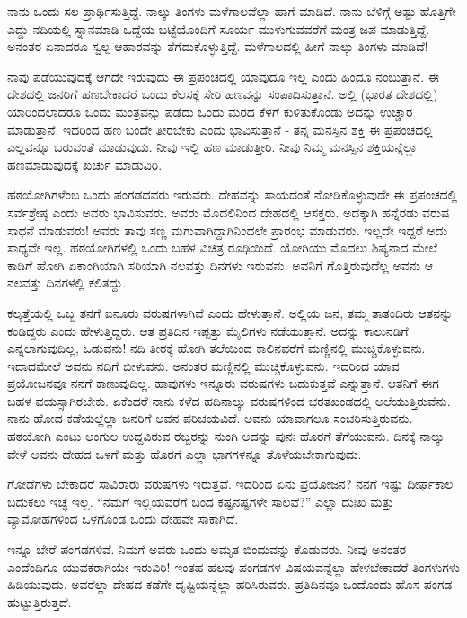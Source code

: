 ನಾನು ಒಂದು ಸಲ ಪ್ರಾರ್ಥಿಸುತ್ತಿದ್ದೆ. ನಾಲ್ಕು ತಿಂಗಳು ಮಳೆಗಾಲವೆಲ್ಲಾ ಹಾಗೆ ಮಾಡಿದೆ. ನಾನು ಬೆಳಿಗ್ಗೆ ಅಷ್ಟು ಹೊತ್ತಿಗೇ ಎದ್ದು ನದಿಯಲ್ಲಿ ಸ್ನಾನಮಾಡಿ ಒದ್ದೆಯ ಬಟ್ಟೆಯೊಂದಿಗೆ ಸೂರ್ಯ ಮುಳುಗುವವರೆಗೆ ಮಂತ್ರ ಜಪ ಮಾಡುತ್ತಿದ್ದೆ. ಅನಂತರ ಏನಾದರೂ ಸ್ವಲ್ಪ ಆಹಾರವನ್ನು ತೆಗೆದುಕೊಳ್ಳುತ್ತಿದ್ದೆ. ಮಳೆಗಾಲದಲ್ಲಿ ಹೀಗೆ ನಾಲ್ಕು ತಿಂಗಳು ಮಾಡಿದೆ!

ನಾವು ಪಡೆಯುವುದಕ್ಕೆ ಆಗದೇ ಇರುವುದು ಈ ಪ್ರಪಂಚದಲ್ಲಿ ಯಾವುದೂ ಇಲ್ಲ ಎಂದು ಹಿಂದೂ ನಂಬುತ್ತಾನೆ. ಈ ದೇಶದಲ್ಲಿ ಜನರಿಗೆ ಹಣಬೇಕಾದರೆ ಒಂದು ಕೆಲಸಕ್ಕೆ ಸೇರಿ ಹಣವನ್ನು ಸಂಪಾದಿಸುತ್ತಾನೆ. ಅಲ್ಲಿ (ಭಾರತ ದೇಶದಲ್ಲಿ) ಯಾರಿಂದಲಾದರೂ ಒಂದು ಮಂತ್ರವನ್ನು ಪಡೆದು ಒಂದು ಮರದ ಕೆಳಗೆ ಕುಳಿತುಕೊಂಡು ಅದನ್ನು ಉಚ್ಚಾರ ಮಾಡುತ್ತಾನೆ. ಇದರಿಂದ ಹಣ ಬಂದೇ ತೀರಬೇಕು ಎಂದು ಭಾವಿಸುತ್ತಾನೆ - ತನ್ನ ಮನಸ್ಸಿನ ಶಕ್ತಿ ಈ ಪ್ರಪಂಚದಲ್ಲಿ ಎಲ್ಲವನ್ನೂ ಬರುವಂತೆ ಮಾಡುವುದು. ನೀವು ಇಲ್ಲಿ ಹಣ ಮಾಡುತ್ತೀರಿ. ನೀವು ನಿಮ್ಮ ಮನಸ್ಸಿನ ಶಕ್ತಿಯನ್ನೆಲ್ಲಾ ಹಣಮಾಡುವುದಕ್ಕೆ ಖರ್ಚು ಮಾಡುವಿರಿ.

ಹಠಯೋಗಿಗಳೆಂಬ ಒಂದು ಪಂಗಡದವರು ಇರುವರು. ದೇಹವನ್ನು ಸಾಯದಂತೆ ನೋಡಿಕೊಳ್ಳುವುದೇ ಈ ಪ್ರಪಂಚದಲ್ಲಿ ಸರ್ವಶ್ರೇಷ್ಠ ಎಂದು ಅವರು ಭಾವಿಸುವರು. ಅವರು ಮೊದಲಿನಿಂದ ದೇಹದಲ್ಲಿ ಆಸಕ್ತರು. ಅದಕ್ಕಾಗಿ ಹನ್ನೆರಡು ವರುಷ ಸಾಧನೆ ಮಾಡುವರು! ಅವರು ತಾವು ಸಣ್ಣ ಮಗುವಾಗಿದ್ದಾಗಿನಿಂದಲೇ ಪ್ರಾರಂಭ ಮಾಡುವರು. ಇಲ್ಲದೇ ಇದ್ದರೆ ಅದು ಸಾಧ್ಯವೇ ಇಲ್ಲ. ಹಠಯೋಗಿಗಳಲ್ಲಿ ಒಂದು ಬಹಳ ವಿಚಿತ್ರ ರೂಢಿಯಿದೆ. ಯೋಗಿಯು ಮೊದಲು ಶಿಷ್ಯನಾದ ಮೇಲೆ ಕಾಡಿಗೆ ಹೋಗಿ ಏಕಾಂಗಿಯಾಗಿ ಸರಿಯಾಗಿ ನಲವತ್ತು ದಿನಗಳು ಇರುವನು. ಅವನಿಗೆ ಗೊತ್ತಿರುವುದೆಲ್ಲ ಅವನು ಆ ನಲವತ್ತು ದಿನಗಳಲ್ಲಿ ಕಲಿತದ್ದು.

ಕಲ್ಕತ್ತೆಯಲ್ಲಿ ಒಬ್ಬ ತನಗೆ ಐನೂರು ವರುಷಗಳಾಗಿವೆ ಎಂದು ಹೇಳುತ್ತಾನೆ. ಅಲ್ಲಿಯ ಜನ, ತಮ್ಮ ತಾತಂದಿರು ಆತನನ್ನು ಕಂಡಿದ್ದರು ಎಂದು ಹೇಳುತ್ತಿದ್ದರು. ಆತ ಪ್ರತಿದಿನ ಇಪ್ಪತ್ತು ಮೈಲಿಗಳು ನಡೆಯುತ್ತಾನೆ. ಅದನ್ನು ಕಾಲುನಡಿಗೆ ಎನ್ನಲಾಗುವುದಿಲ್ಲ, ಓಡುವನು! ನದಿ ತೀರಕ್ಕೆ ಹೋಗಿ ತಲೆಯಿಂದ ಕಾಲಿನವರೆಗೆ ಮಣ್ಣಿನಲ್ಲಿ ಮುಚ್ಚಿಕೊಳ್ಳುವನು. ಇದಾದಮೇಲೆ ಅವನು ನದಿಗೆ ಬೀಳುವನು. ಅನಂತರ ಮಣ್ಣಿನಲ್ಲಿ ಮುಚ್ಚಿಕೊಳ್ಳುವನು. ಇದರಿಂದ ಯಾವ ಪ್ರಯೋಜನವೂ ನನಗೆ ಕಾಣುವುದಿಲ್ಲ. ಹಾವುಗಳು ಇನ್ನೂರು ವರುಷಗಳು ಬದುಕುತ್ತವೆ ಎನ್ನುತ್ತಾನೆ. ಆತನಿಗೆ ಈಗ ಬಹಳ ವಯಸ್ಸಾಗಿರಬೇಕು. ಏಕೆಂದರೆ ನಾನು ಕಳೆದ ಹದಿನಾಲ್ಕು ವರುಷಗಳಿಂದ ಭರತಖಂಡದಲ್ಲಿ ಅಲೆಯುತ್ತಿರುವೆನು. ನಾನು ಹೋದ ಕಡೆಯಲ್ಲೆಲ್ಲಾ ಜನರಿಗೆ ಅವನ ಪರಿಚಯವಿದೆ. ಅವನು ಯಾವಾಗಲೂ ಸಂಚರಿಸುತ್ತಿರುವನು. ಹಠಯೋಗಿ ಎಂಟು ಅಂಗುಲ ಉದ್ದವಿರುವ ರಬ್ಬರನ್ನು ನುಂಗಿ ಅದನ್ನು ಪುನಃ ಹೊರಗೆ ತೆಗೆಯುವನು. ದಿನಕ್ಕೆ ನಾಲ್ಕು ವೇಳೆ ಅವನು ದೇಹದ ಒಳಗೆ ಮತ್ತು ಹೊರಗೆ ಎಲ್ಲಾ ಭಾಗಗಳನ್ನೂ ತೊಳೆಯಬೇಕಾಗುವುದು.

ಗೋಡೆಗಳು ಬೇಕಾದರೆ ಸಾವಿರಾರು ವರುಷಗಳು ಇರುತ್ತವೆ. ಇದರಿಂದ ಏನು ಪ್ರಯೋಜನ? ನನಗೆ ಇಷ್ಟು ದೀರ್ಘಕಾಲ ಬದುಕಲು ಇಚ್ಛೆ ಇಲ್ಲ. “ನಮಗೆ ಇಲ್ಲಿಯವರೆಗೆ ಬಂದ ಕಷ್ಟನಷ್ಟಗಳೇ ಸಾಲವೆ?” ಎಲ್ಲಾ ದುಃಖ ಮತ್ತು ವ್ಯಾಮೋಹಗಳಿಂದ ಒಳಗೊಂಡ ಒಂದು ದೇಹವೇ ಸಾಕಾಗಿದೆ.

ಇನ್ನೂ ಬೇರೆ ಪಂಗಡಗಳಿವೆ. ನಿಮಗೆ ಅವರು ಒಂದು ಅಮೃತ ಬಿಂದುವನ್ನು ಕೊಡುವರು. ನೀವು ಅನಂತರ ಎಂದೆಂದಿಗೂ ಯುವಕರಾಗಿಯೇ ಇರುವಿರಿ! ಇಂತಹ ಹಲವು ಪಂಗಡಗಳ ವಿಷಯವನ್ನೆಲ್ಲಾ ಹೇಳಬೇಕಾದರೆ ತಿಂಗಳುಗಳು ಹಿಡಿಯುವುದು. ಅವರೆಲ್ಲಾ ದೇಹದ ಕಡೆಗೇ ದೃಷ್ಟಿಯನ್ನೆಲ್ಲಾ ಹರಿಸಿರುವರು. ಪ್ರತಿದಿನವೂ ಒಂದೊಂದು ಹೊಸ ಪಂಗಡ ಹುಟ್ಟುತ್ತಿರುತ್ತದೆ.

